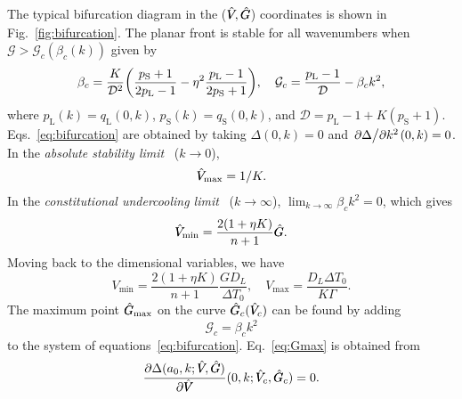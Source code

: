 \documentclass{article}
\newcommand{\liq}{\text{L}}
\newcommand{\sol}{\text{S}}
\newcommand{\qL}{q_\liq}
\newcommand{\qS}{q_\sol}
\newcommand{\pL}{p_\liq}
\newcommand{\pS}{p_\sol}
\newcommand{\hV}[1][\qty(\bar{V})]{\vphantom{#1}\mathrlap{\smash{\hat{V}}}V}
\newcommand{\hG}[1][\qty(\bar{G})]{\vphantom{#1}\mathrlap{\smash{\hat{G}}}G}
\begin{document}
The typical bifurcation diagram in the ($\hV,\hG$) coordinates is shown in Fig.~\ref{fig:bifurcation}.
The planar front is stable for all wavenumbers when $\mathcal{G} > \mathcal{G}_c(\beta_c(k))$ given by
\begin{equation}\label{eq:bifurcation}
    \beta_c = \frac{K}{\mathcal{D}^2}\qty(\frac{\pS+1}{2\pL-1} - \eta^2\frac{\pL-1}{2\pS+1}), \quad
    \mathcal{G}_c = \frac{\pL-1}{\mathcal{D}} - \beta_c k^2,
\end{equation}
where $\pL(k)=\qL(0,k)$, $\pS(k)=\qS(0,k)$, and $\mathcal{D} = \pL-1 + K(\pS+1)$.
Eqs.~\eqref{eq:bifurcation} are obtained by taking $\Delta(0,k)=0$ and ${\pdv*{\Delta}{k^2}}(0,k)=0$.
In the \emph{absolute stability limit}~\cite{mullins1964stability} ($k\to0$),
\begin{equation}\label{eq:Vmax}
    \hV_\text{max} = 1/K.
\end{equation}
In the \emph{constitutional undercooling limit}~\cite{tiller1953redistribution} ($k\to\infty$),
$\lim_{k\to\infty}\beta_ck^2 = 0$, which gives
\begin{equation}\label{eq:Vmin}
    \hV_\text{min} = \frac{2(1+\eta K)}{n+1}\hG.
\end{equation}
Moving back to the dimensional variables, we have
\begin{equation}\label{eq:Vminmax}
    V_\text{min} = \frac{2(1+\eta K)}{n+1}\frac{GD_L}{\Delta{T}_0}, \quad
    V_\text{max} = \frac{D_L\Delta{T}_0}{K\Gamma}.
\end{equation}
The maximum point $\hG_\text{max}$ on the curve $\hG_c(\hV_c)$ can be found by adding
\begin{equation}\label{eq:Gmax}
    \mathcal{G}_c = \beta_c k^2
\end{equation}
to the system of equations~\eqref{eq:bifurcation}.
Eq.~\eqref{eq:Gmax} is obtained from
\begin{equation*}
    {\pdv{\Delta(a_0,k;\hV,\hG)}{\hV}}(0,k;\hV_c,\hG_c) = 0.
\end{equation*}
\end{document}
